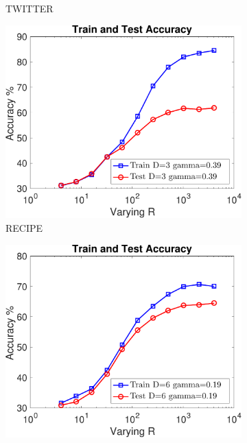 \documentclass[11pt,a4paper]{article}
\newcommand{\1}{\boldsymbol{1}}
\begin{document}
\begin{figure}[htb]
\begin{subfigure}[b]{0.23\textwidth}
      \caption{TWITTER}
      \label{App:fig:exptsA_varyingR_twitter}
      \end{subfigure}
		\begin{subfigure}[b]{0.23\textwidth}
      \includegraphics[width=\textwidth]{Graphs/wmdk_varyingR/recipe2_random_VaryingR_allSplits_CV_R512-eps-converted-to.pdf}
      \caption{RECIPE}
      \label{App:fig:exptsA_varyingR_recipe2}
      \end{subfigure}
		\begin{subfigure}[b]{0.23\textwidth}
      \includegraphics[width=\textwidth]{Graphs/wmdk_varyingR/ohsumed_random_VaryingR_allSplits_CV_R512-eps-converted-to.pdf}

\end{subfigure}
\end{figure}
\end{document}
